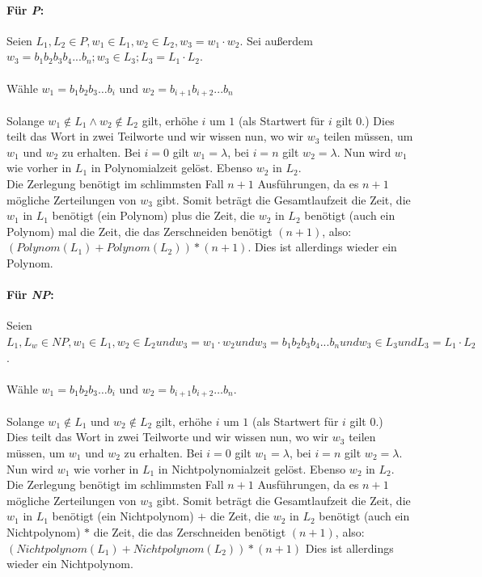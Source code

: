 \documentclass{article}
\begin{document}
\paragraph{Für \textit{P}:}
Seien $L_1, L_2 \in P, w_1 \in L_1, w_2 \in L_2, w_3 = w_1 \cdot w_2$.
Sei außerdem $w_3 = b_1 b_2 b_3 b_4... b_n; w_3 \in L_3; L_3 = L_1 \cdot L_2$.\\
\-\\
Wähle $w_1 = b_1 b_2 b_3 \dots b_i$ und $w_2 = b_{i+1} b_{i+2} ... b_n$\\
\-\\
Solange $w_1 \not \in L_1 \land w_2 \not \in L_2$ gilt, erhöhe $i$ um $1$ (als Startwert für $i$ gilt $0$.)
Dies teilt das Wort in zwei Teilworte und wir wissen nun, wo wir $w_3$ teilen müssen, um $w_1$ und $w_2$ zu erhalten.
Bei $i = 0$ gilt $w_1 = \lambda$, bei $i = n$ gilt $w_2 = \lambda$.
Nun wird $w_1$ wie vorher in $L_1$ in Polynomialzeit gelöst.
Ebenso $w_2$ in $L_2$.\\
Die Zerlegung benötigt im schlimmsten Fall $n+1$ Ausführungen, da es $n+1$ mögliche Zerteilungen von $w_3$ gibt.
Somit beträgt die Gesamtlaufzeit die Zeit, die $w_1$ in $L_1$ benötigt (ein Polynom) plus die Zeit, die $w_2$ in $L_2$ benötigt (auch ein Polynom) mal die Zeit, die das Zerschneiden benötigt $(n+1)$, also: $(Polynom(L_1) + Polynom(L_2)) * (n+1)$.
Dies ist allerdings wieder ein Polynom.

\paragraph{Für \textit{NP}:}
Seien $L_1, L_w \in \textit{NP}, w_1 \in L_1, w_2 \in L_2 und w_3 = w_1 \cdot w_2 und w_3 = b_1 b_2 b_3 b_4... b_n und w_3 \in L_3 und L_3 = L_1 \cdot L_2$.\\
\-\\
Wähle $w_1 = b_1 b_2 b_3 \dots b_i$ und $w_2 = b_{i+1} b_{i+2} \dots b_n$.\\
\-\\
Solange $w_1 \not \in L_1$ und $w_2 \not \in L_2$ gilt, erhöhe $i$ um $1$ (als Startwert für $i$ gilt $0$.)\\
Dies teilt das Wort in zwei Teilworte und wir wissen nun, wo wir $w_3$ teilen müssen, um $w_1$ und $w_2$ zu erhalten.
Bei $i = 0$ gilt $w_1 = \lambda$, bei $i = n$ gilt $w_2 = \lambda$.
Nun wird $w_1$ wie vorher in $L_1$ in Nichtpolynomialzeit gelöst.
Ebenso $w_2$ in $L_2$.\\
Die Zerlegung benötigt im schlimmsten Fall $n+1$ Ausführungen, da es $n+1$ mögliche Zerteilungen von $w_3$ gibt.
Somit beträgt die Gesamtlaufzeit die Zeit, die $w_1$ in $L_1$ benötigt (ein Nichtpolynom) $+$ die Zeit, die $w_2$ in $L_2$ benötigt (auch ein Nichtpolynom) $*$ die Zeit, die das Zerschneiden benötigt $(n+1)$, also: $(Nichtpolynom(L_1) + Nichtpolynom(L_2)) * (n+1)$
Dies ist allerdings wieder ein Nichtpolynom.
\end{document}
